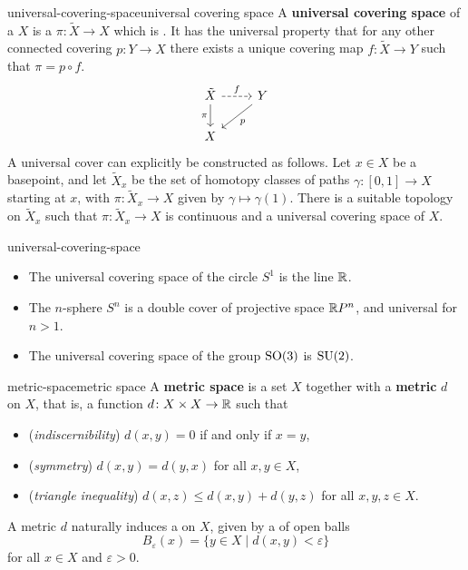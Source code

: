 \begin{topic}{universal-covering-space}{universal covering space}
    A \textbf{universal covering space} of a  $X$ is a  $\pi \colon \tilde{X} \to X$ which is . It has the universal property that for any other connected covering $p \colon Y \to X$ there exists a unique covering map $f \colon \tilde{X} \to Y$ such that $\pi = p \circ f$.
    \[ \svg \begin{tikzcd} \tilde{X} \arrow[swap]{d}{\pi} \arrow[dashed]{r}{f} & Y \arrow{dl}{p} \\ X & \end{tikzcd} \]
    A universal cover can explicitly be constructed as follows. Let $x \in X$ be a basepoint, and let $\tilde{X}_x$ be the set of homotopy classes of paths $\gamma \colon [0, 1] \to X$ starting at $x$, with $\pi \colon \tilde{X}_x \to X$ given by $\gamma \mapsto \gamma(1)$. There is a suitable topology on $\tilde{X}_x$ such that $\pi \colon \tilde{X}_x \to X$ is continuous and a universal covering space of $X$.
\end{topic}

\begin{example}{universal-covering-space}
    \begin{itemize}
        \item The universal covering space of the circle $S^1$ is the line $\mathbb{R}$.
        \item The $n$-sphere $S^n$ is a double cover of projective space $\mathbb{R} P^n$, and universal for $n > 1$.
        \item The universal covering space of the group $\textup{SO}(3)$ is $\textup{SU}(2)$. 
    \end{itemize}    
\end{example}

\begin{topic}{metric-space}{metric space}
    A \textbf{metric space} is a set $X$ together with a \textbf{metric} $d$ on $X$, that is, a function $d \colon X \times X \to \mathbb{R}$ such that
    \begin{itemize}
        \item (\textit{indiscernibility}) $d(x, y) = 0$ if and only if $x = y$,
        \item (\textit{symmetry}) $d(x, y) = d(y, x)$ for all $x, y \in X$,
        \item (\textit{triangle inequality}) $d(x, z) \le d(x, y) + d(y, z)$ for all $x, y, z \in X$.
    \end{itemize}
    A metric $d$ naturally induces a  on $X$, given by a  of open balls
    \[ B_\varepsilon(x) = \{ y \in X \mid d(x, y) < \varepsilon \} \]
    for all $x \in X$ and $\varepsilon > 0$.
\end{topic}

